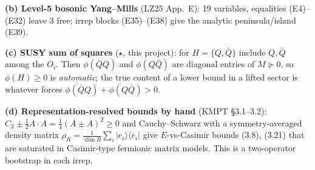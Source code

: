\documentclass[10pt,a4paper]{article}
\newcommand{\Qb}{\bar Q}
\begin{document}
\smallskip\noindent\textbf{(b) Level-5 bosonic Yang--Mills} (LZ25 App.~E): 19 variables, equalities (E4)--(E32) leave 3 free; irrep blocks (E35)--(E38) give the analytic peninsula/island (E39).

\smallskip\noindent\textbf{(c) SUSY sum of squares} ($\star$, this project): for $H=\{Q,\Qb\}$ include $Q,\Qb$ among the $O_i$. Then $\phi(\Qb Q)$ and $\phi(Q\Qb)$ are diagonal entries of $M\succeq0$, so $\phi(H)\ge0$ is \emph{automatic}; the true content of a lower bound in a lifted sector is whatever forces $\phi(\Qb Q)+\phi(Q\Qb)>0$.

\smallskip\noindent\textbf{(d) Representation-resolved bounds by hand} (KMPT \S3.1--3.2): $C_2\pm\tfrac12A\!\cdot\!A=\tfrac14(A\pm A)^2\ge0$ and Cauchy--Schwarz with a symmetry-averaged density matrix $\rho_R=\frac1{\dim R}\sum_i|e_i\rangle\langle e_i|$ give $E$-vs-Casimir bounds (3.8), (3.21) that are saturated in Casimir-type fermionic matrix models. This is a two-operator bootstrap in each irrep.
\end{document}
